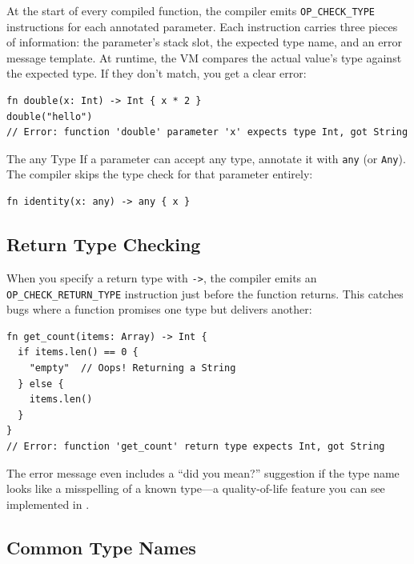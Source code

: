 At the start of every compiled function, the compiler emits \lstinline|OP_CHECK_TYPE| instructions for each annotated parameter. Each instruction carries three pieces of information: the parameter's stack slot, the expected type name, and an error message template. At runtime, the VM compares the actual value's type against the expected type. If they don't match, you get a clear error:

\begin{lstlisting}[language=Lattice, caption={Type mismatch error}]
fn double(x: Int) -> Int { x * 2 }
double("hello")
// Error: function 'double' parameter 'x' expects type Int, got String
\end{lstlisting}

\begin{notebox}{The any Type}
If a parameter can accept any type, annotate it with \lstinline|any| (or \lstinline|Any|). The compiler skips the type check for that parameter entirely:
\begin{lstlisting}[language=Lattice, numbers=none]
fn identity(x: any) -> any { x }
\end{lstlisting}
\end{notebox}

\subsection{Return Type Checking}\label{sec:return-type-checking}

When you specify a return type with \lstinline|->|, the compiler emits an \lstinline|OP_CHECK_RETURN_TYPE| instruction just before the function returns. This catches bugs where a function promises one type but delivers another:

\begin{lstlisting}[language=Lattice, caption={Return type checking}]
fn get_count(items: Array) -> Int {
  if items.len() == 0 {
    "empty"  // Oops! Returning a String
  } else {
    items.len()
  }
}
// Error: function 'get_count' return type expects Int, got String
\end{lstlisting}

The error message even includes a ``did you mean?'' suggestion if the type name looks like a misspelling of a known type---a quality-of-life feature you can see implemented in .

\subsection{Common Type Names}\label{sec:common-type-names}

